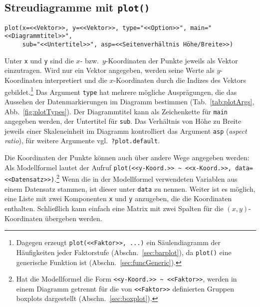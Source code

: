 \subsection{Streudiagramme mit \texttt{plot()}}

\begin{lstlisting}
plot(x=<<Vektor>>, y=<<Vektor>>, type="<<Option>>", main="<<Diagrammtitel>>",
     sub="<<Untertitel>>", asp=<<Seitenverhältnis Höhe/Breite>>)
\end{lstlisting}

Unter \lstinline!x! und \lstinline!y! sind die $x$- bzw.\ $y$-Koordinaten der Punkte jeweils als Vektor einzutragen. Wird nur ein Vektor angegeben, werden seine Werte als $y$-Koordinaten interpretiert und die $x$-Koordinaten durch die Indizes des Vektors gebildet.\footnote{Dagegen erzeugt \lstinline!plot(<<Faktor>>, ...)! ein Säulendiagramm der Häufigkeiten jeder Faktorstufe (Abschn.\ \ref{sec:barplot}), da \lstinline!plot()! eine generische Funktion ist (Abschn.\ \ref{sec:funcGeneric}).} Das Argument \lstinline!type! hat mehrere mögliche Ausprägungen, die das Aussehen der Datenmarkierungen im Diagramm bestimmen (Tab.\ \ref{tab:plotArgs}, Abb.\ \ref{fig:plotTypes}). Der Diagrammtitel kann als Zeichenkette für \lstinline!main! angegeben werden, der Untertitel für \lstinline!sub!. Das Verhältnis von Höhe zu Breite jeweils einer Skaleneinheit im Diagramm kontrolliert das Argument \lstinline!asp! (\emph{aspect ratio}), für weitere Argumente vgl.\ \lstinline!?plot.default!.

Die Koordinaten der Punkte können auch über andere Wege angegeben werden: Als Modellformel lautet der Aufruf \lstinline!plot(<<y-Koord.>> ~ <<x-Koord.>>, data=<<Datensatz>>)!.\footnote{Hat die Modellformel die Form \lstinline!<<y-Koord.>> ~ <<Faktor>>!, werden in einem Diagramm getrennt für die von \lstinline!<<Faktor>>! definierten Gruppen boxplots dargestellt (Abschn.\ \ref{sec:boxplot}).} Wenn die in der Modellformel verwendeten Variablen aus einem Datensatz stammen, ist dieser unter \lstinline!data! zu nennen. Weiter ist es möglich, eine Liste mit zwei Komponenten \lstinline!x! und \lstinline!y! anzugeben, die die Koordinaten enthalten. Schließlich kann einfach eine Matrix mit zwei Spalten für die $(x, y)$-Koordinaten übergeben werden.

